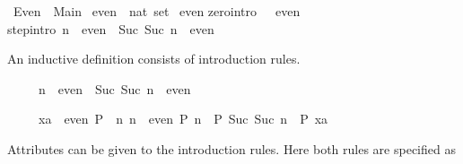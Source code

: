 %
\begin{isabellebody}%
\def\isabellecontext{Even}%
\isanewline
{}\ Even\ {\isacharequal}\ Main{\isacharcolon}\isanewline
\isanewline
\isanewline
{}\ even\ {\isacharcolon}{\isacharcolon}\ {\isachardoublequote}nat\ set{\isachardoublequote}\isanewline
{}\ even\isanewline
{}\isanewline
zero{\isacharbrackleft}intro{\isacharbang}{\isacharbrackright}{\isacharcolon}\ {\isachardoublequote}{}\ {\isasymin}\ even{\isachardoublequote}\isanewline
step{\isacharbrackleft}intro{\isacharbang}{\isacharbrackright}{\isacharcolon}\ {\isachardoublequote}n\ {\isasymin}\ even\ {\isasymLongrightarrow}\ {\isacharparenleft}Suc\ {\isacharparenleft}Suc\ n{\isacharparenright}{\isacharparenright}\ {\isasymin}\ even{\isachardoublequote}%
\begin{isamarkuptext}%
An inductive definition consists of introduction rules. 

\begin{isabelle}%
\ \ \ \ \ n\ {\isasymin}\ even\ {\isasymLongrightarrow}\ Suc\ {\isacharparenleft}Suc\ n{\isacharparenright}\ {\isasymin}\ even%
\end{isabelle}

\begin{isabelle}%
\ \ \ \ \ {\isasymlbrakk}xa\ {\isasymin}\ even{\isacharsemicolon}\ P\ {}{\isacharsemicolon}\ {\isasymAnd}n{\isachardot}\ {\isasymlbrakk}n\ {\isasymin}\ even{\isacharsemicolon}\ P\ n{\isasymrbrakk}\ {\isasymLongrightarrow}\ P\ {\isacharparenleft}Suc\ {\isacharparenleft}Suc\ n{\isacharparenright}{\isacharparenright}{\isasymrbrakk}\ {\isasymLongrightarrow}\ P\ xa%
\end{isabelle}

Attributes can be given to the introduction rules.  Here both rules are
specified as 


\end{isamarkuptext}
\end{isabellebody}
